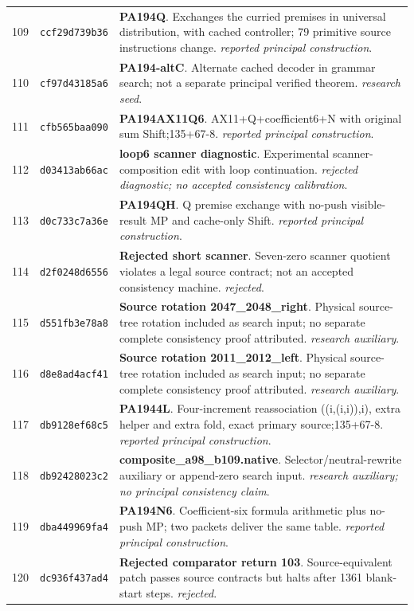 \begin{longtable}{@{}r p{} p{}@{}}
109 & \texttt{ccf29d739b36} & \textbf{PA194Q}. Exchanges the curried premises in universal distribution, with cached controller; 79 primitive source instructions change. \emph{reported principal construction}.\\[3pt]
110 & \texttt{cf97d43185a6} & \textbf{PA194-altC}. Alternate cached decoder in grammar search; not a separate principal verified theorem. \emph{research seed}.\\[3pt]
111 & \texttt{cfb565baa090} & \textbf{PA194AX11Q6}. AX11+Q+coefficient6+N with original sum Shift;135+67-8. \emph{reported principal construction}.\\[3pt]
112 & \texttt{d03413ab66ac} & \textbf{loop6 scanner diagnostic}. Experimental scanner-composition edit with loop continuation. \emph{rejected diagnostic; no accepted consistency calibration}.\\[3pt]
113 & \texttt{d0c733c7a36e} & \textbf{PA194QH}. Q premise exchange with no-push visible-result MP and cache-only Shift. \emph{reported principal construction}.\\[3pt]
114 & \texttt{d2f0248d6556} & \textbf{Rejected short scanner}. Seven-zero scanner quotient violates a legal source contract; not an accepted consistency machine. \emph{rejected}.\\[3pt]
115 & \texttt{d551fb3e78a8} & \textbf{Source rotation 2047\_2048\_right}. Physical source-tree rotation included as search input; no separate complete consistency proof attributed. \emph{research auxiliary}.\\[3pt]
116 & \texttt{d8e8ad4acf41} & \textbf{Source rotation 2011\_2012\_left}. Physical source-tree rotation included as search input; no separate complete consistency proof attributed. \emph{research auxiliary}.\\[3pt]
117 & \texttt{db9128ef68c5} & \textbf{PA1944L}. Four-increment reassociation ((i,(i,i)),i), extra helper and extra fold, exact primary source;135+67-8. \emph{reported principal construction}.\\[3pt]
118 & \texttt{db92428023c2} & \textbf{composite\_a98\_b109.native}. Selector/neutral-rewrite auxiliary or append-zero search input. \emph{research auxiliary; no principal consistency claim}.\\[3pt]
119 & \texttt{dba449969fa4} & \textbf{PA194N6}. Coefficient-six formula arithmetic plus no-push MP; two packets deliver the same table. \emph{reported principal construction}.\\[3pt]
120 & \texttt{dc936f437ad4} & \textbf{Rejected comparator return 103}. Source-equivalent patch passes source contracts but halts after 1361 blank-start steps. \emph{rejected}.\\[3pt]

\end{longtable}
